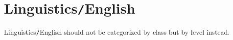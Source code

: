 \documentclass{article}
\begin{document}

\section{Linguistics\texttt{/}English}
Linguistics\texttt{/}English should not be categorized by class but by level instead.


\printbibliography[heading=bibintoc]
	
\end{document}
